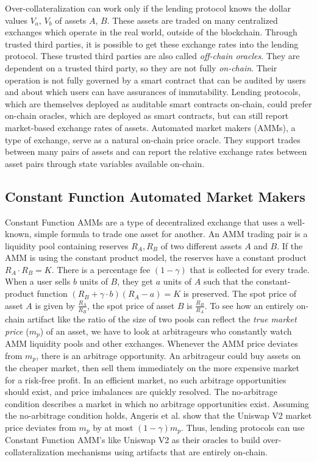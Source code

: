Over-collateralization can work only if the lending protocol knows the dollar values $V_a$, $V_b$ of assets $A$, $B$. These assets are traded on many centralized exchanges which operate in the real world, outside of the blockchain. Through trusted third parties, it is possible to get these exchange rates into the lending protocol. These trusted third parties are also called \textit{off-chain oracles}. They are dependent on a trusted third party, so they are not fully \textit{on-chain}. Their operation is not fully governed by a smart contract that can be audited by users and about which users can have assurances of immutability. Lending protocols, which are themselves deployed as auditable smart contracts on-chain, could prefer on-chain oracles, which are deployed as smart contracts, but can still report market-based exchange rates of assets. Automated market makers (AMMs), a type of exchange, serve as a natural on-chain price oracle. They support trades between many pairs of assets and can report the relative exchange rates between asset pairs through state variables available on-chain. 

\subsection{Constant Function Automated Market Makers}
Constant Function AMMs \cite{Zhang2018UniV1} are a type of decentralized exchange that uses a well-known, simple formula to trade one asset for another. An AMM trading pair is a liquidity pool containing reserves $R_A, R_B$ of two different assets $A$ and $B$. If the AMM is using the constant product model, the reserves have a constant product $R_A \cdot R_B = K$. There is a percentage fee $(1 - \gamma)$ that is collected for every trade. When a user sells $b$ units of $B$, they get $a$ units of $A$ such that the constant-product function $(R_B + \gamma \cdot b) (R_A - a) = K$ is preserved. The spot price of asset $A$ is given by $\frac{R_A}{R_B}$, the spot price of asset $B$ is $\frac{R_B}{R_A}$. To see how an entirely on-chain artifact like the ratio of the size of two pools can reflect the \textit{true market price} ($m_p$) of an asset, we have to look at arbitrageurs who constantly watch AMM liquidity pools and other exchanges. Whenever the AMM price deviates from $m_p$, there is an arbitrage opportunity. An arbitrageur could buy assets on the cheaper market, then sell them immediately on the more expensive market for a risk-free profit. In an efficient market, no such arbitrage opportunities should exist, and price imbalances are quickly resolved. The no-arbitrage condition describes a market in which no arbitrage opportunities exist.  Assuming the no-arbitrage condition holds, Angeris et al. \cite{angeris2019uniswap} show that the Uniswap V2 market price deviates from $m_p$ by at most $(1-\gamma)m_p$. Thus, lending protocols can use Constant Function AMM's like Uniswap V2 as their oracles to build over-collateralization mechanisms using artifacts that are entirely on-chain. 

